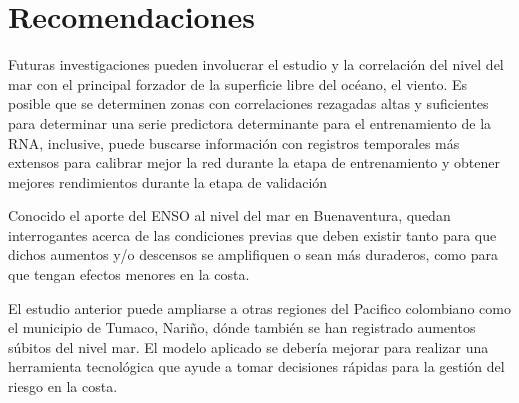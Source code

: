 \section{Recomendaciones}

Futuras investigaciones pueden involucrar el estudio y la correlación del nivel del mar con el principal forzador de la superficie libre del océano, el viento. Es posible que se determinen zonas con correlaciones rezagadas altas y suficientes para determinar una serie predictora determinante para el entrenamiento de la RNA, inclusive, puede buscarse información con registros temporales más extensos para calibrar mejor la red durante la etapa de entrenamiento y obtener mejores rendimientos durante la etapa de validación

Conocido el aporte del ENSO al nivel del mar en Buenaventura, quedan interrogantes acerca de las condiciones previas que deben existir tanto para que dichos aumentos y/o descensos se amplifiquen o sean más duraderos, como para que tengan efectos menores en la costa. 

El estudio anterior puede ampliarse a otras regiones del Pacifico colombiano como el municipio de Tumaco, Nariño, dónde también se han registrado aumentos súbitos del nivel mar. El modelo aplicado se debería mejorar para realizar una herramienta tecnológica que ayude a tomar decisiones rápidas para la gestión del riesgo en la costa.